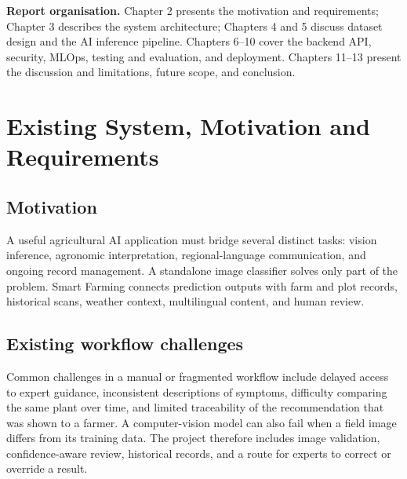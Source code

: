\documentclass[12pt,a4paper,oneside,openany]{report}
\begin{document}
\noindent\textbf{Report organisation.} Chapter 2 presents the motivation and requirements; Chapter 3 describes the system architecture; Chapters 4 and 5 discuss dataset design and the AI inference pipeline. Chapters 6--10 cover the backend API, security, MLOps, testing and evaluation, and deployment. Chapters 11--13 present the discussion and limitations, future scope, and conclusion.
\chapter{Existing System, Motivation and Requirements}
\section{Motivation}
A useful agricultural AI application must bridge several distinct tasks: vision inference, agronomic interpretation, regional-language communication, and ongoing record management. A standalone image classifier solves only part of the problem. Smart Farming connects prediction outputs with farm and plot records, historical scans, weather context, multilingual content, and human review.

\section{Existing workflow challenges}
Common challenges in a manual or fragmented workflow include delayed access to expert guidance, inconsistent descriptions of symptoms, difficulty comparing the same plant over time, and limited traceability of the recommendation that was shown to a farmer. A computer-vision model can also fail when a field image differs from its training data. The project therefore includes image validation, confidence-aware review, historical records, and a route for experts to correct or override a result.

\clearpage
\end{document}
